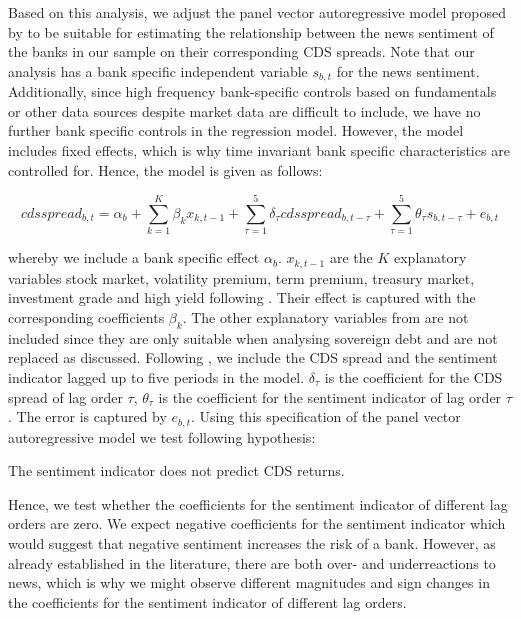 Based on this analysis, we adjust the panel vector autoregressive model proposed by \cite{cathcart2020} to be suitable for estimating the relationship between the news sentiment of the banks in our sample on their corresponding CDS spreads. Note that our analysis has a bank specific independent variable $s_{b,t}$ for the news sentiment. Additionally, since high frequency bank-specific controls based on fundamentals or other data sources despite market data are difficult to include, we have no further bank specific controls in the regression model. However, the model includes fixed effects, which is why time invariant bank specific characteristics are controlled for. Hence, the model is given as follows:

\begin{equation} \label{eq:panelvar-cds-exogsenti}
	cdsspread_{b,t} = \alpha_b + \sum_{k=1}^K\beta_{k}x_{k,t-1} + \sum^5_{\tau=1} \delta_{\tau}cdsspread_{b,t-\tau} + \sum^5_{\tau=1}\theta_{\tau}s_{b,t-\tau} + e_{b,t}
\end{equation}

whereby we include a bank specific effect $\alpha_b$. $x_{k,t-1}$ are the $K$ explanatory variables stock market, volatility premium, term premium, treasury market, investment grade and high yield following \cite{cathcart2020}. Their effect is captured with the corresponding coefficients $\beta_k$. The other explanatory variables from \cite{cathcart2020} are not included since they are only suitable when analysing sovereign debt and are not replaced as discussed. Following \cite{cathcart2020}, we include the CDS spread and the sentiment indicator lagged up to five periods in the model. $\delta_\tau$ is the coefficient for the CDS spread of lag order $\tau$, $\theta_\tau$ is the coefficient for the sentiment indicator of lag order $\tau$. The error is captured by $e_{b,t}$. Using this specification of the panel vector autoregressive model we test following hypothesis:

\begin{hyp}
	The sentiment indicator does not predict CDS returns.
\end{hyp}

Hence, we test whether the coefficients for the sentiment indicator of different lag orders are zero. We expect negative coefficients for the sentiment indicator which would suggest that negative sentiment increases the risk of a bank. However, as already established in the literature, there are both over- and underreactions to news, which is why we might observe different magnitudes and sign changes in the coefficients for the sentiment indicator of different lag orders. \\

